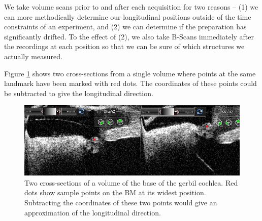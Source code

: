 \documentclass{article}
\begin{document}
\par{We take volume scans prior to and after each acquisition for two reasons -- (1) we can more methodically determine our longitudinal positions outside of the time constraints of an experiment, and (2) we can determine if the preparation has significantly drifted. To the effect of (2), we also take B-Scans immediately after the recordings at each position so that we can be sure of which structures we actually measured.}
\par{Figure \ref{pointselect} shows two cross-sections from a single volume where points at the same landmark have been marked with red dots. The coordinates of these points could be subtracted to give the longitudinal direction.}

\begin{figure}
	\centering
	\includegraphics[width=\textwidth]{Figures/points.png}
	\caption{Two cross-sections of a volume of the base of the gerbil cochlea. Red dots show sample points on the BM at its widest position. Subtracting the coordinates of these two points would give an approximation of the longitudinal direction.}
\label{pointselect}
\end{figure}
\end{document}
